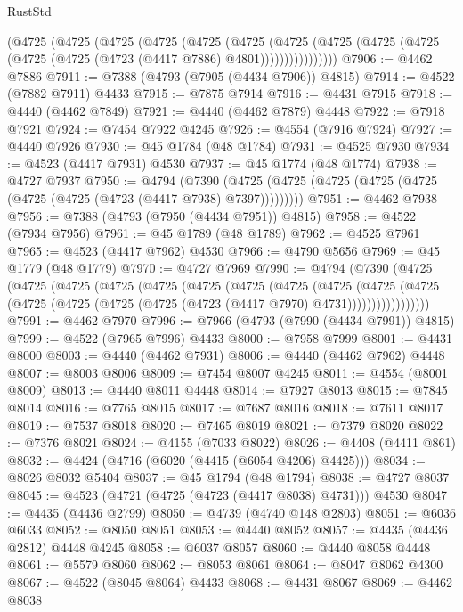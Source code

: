 \begin{lexlean}{RustStd}
\begin{coremodule}
          (@4725
            (@4725
              (@4725
                (@4725
                  (@4725
                    (@4725
                      (@4725
                        (@4725
                          (@4725 (@4725 (@4725 (@4725 (@4723 (@4417 @7886) @4801))))))))))))))))
@7906 := @4462 @7886
@7911 := @7388 (@4793 (@7905 (@4434 @7906)) @4815)
@7914 := @4522 (@7882 @7911) @4433
@7915 := @7875 @7914
@7916 := @4431 @7915
@7918 := @4440 (@4462 @7849)
@7921 := @4440 (@4462 @7879) @4448
@7922 := @7918 @7921
@7924 := @7454 @7922 @4245
@7926 := @4554 (@7916 @7924)
@7927 := @4440 @7926
@7930 := @45 @1784 (@48 @1784)
@7931 := @4525 @7930
@7934 := @4523 (@4417 @7931) @4530
@7937 := @45 @1774 (@48 @1774)
@7938 := @4727 @7937
@7950 := @4794
    (@7390 (@4725 (@4725 (@4725 (@4725 (@4725 (@4725 (@4725 (@4723 (@4417 @7938) @7397)))))))))
@7951 := @4462 @7938
@7956 := @7388 (@4793 (@7950 (@4434 @7951)) @4815)
@7958 := @4522 (@7934 @7956)
@7961 := @45 @1789 (@48 @1789)
@7962 := @4525 @7961
@7965 := @4523 (@4417 @7962) @4530
@7966 := @4790 @5656
@7969 := @45 @1779 (@48 @1779)
@7970 := @4727 @7969
@7990 := @4794
    (@7390
      (@4725
        (@4725
          (@4725
            (@4725
              (@4725
                (@4725
                  (@4725
                    (@4725
                      (@4725
                        (@4725
                          (@4725
                            (@4725 (@4725 (@4725 (@4725 (@4723 (@4417 @7970) @4731)))))))))))))))))
@7991 := @4462 @7970
@7996 := @7966 (@4793 (@7990 (@4434 @7991)) @4815)
@7999 := @4522 (@7965 @7996) @4433
@8000 := @7958 @7999
@8001 := @4431 @8000
@8003 := @4440 (@4462 @7931)
@8006 := @4440 (@4462 @7962) @4448
@8007 := @8003 @8006
@8009 := @7454 @8007 @4245
@8011 := @4554 (@8001 @8009)
@8013 := @4440 @8011 @4448
@8014 := @7927 @8013
@8015 := @7845 @8014
@8016 := @7765 @8015
@8017 := @7687 @8016
@8018 := @7611 @8017
@8019 := @7537 @8018
@8020 := @7465 @8019
@8021 := @7379 @8020
@8022 := @7376 @8021
@8024 := @4155 (@7033 @8022)
@8026 := @4408 (@4411 @861)
@8032 := @4424 (@4716 (@6020 (@4415 (@6054 @4206) @4425)))
@8034 := @8026 @8032 @5404
@8037 := @45 @1794 (@48 @1794)
@8038 := @4727 @8037
@8045 := @4523 (@4721 (@4725 (@4723 (@4417 @8038) @4731))) @4530
@8047 := @4435 (@4436 @2799)
@8050 := @4739 (@4740 @148 @2803)
@8051 := @6036 @6033
@8052 := @8050 @8051
@8053 := @4440 @8052
@8057 := @4435 (@4436 @2812) @4448 @4245
@8058 := @6037 @8057
@8060 := @4440 @8058 @4448
@8061 := @5579 @8060
@8062 := @8053 @8061
@8064 := @8047 @8062 @4300
@8067 := @4522 (@8045 @8064) @4433
@8068 := @4431 @8067
@8069 := @4462 @8038

\end{coremodule}
\end{lexlean}
